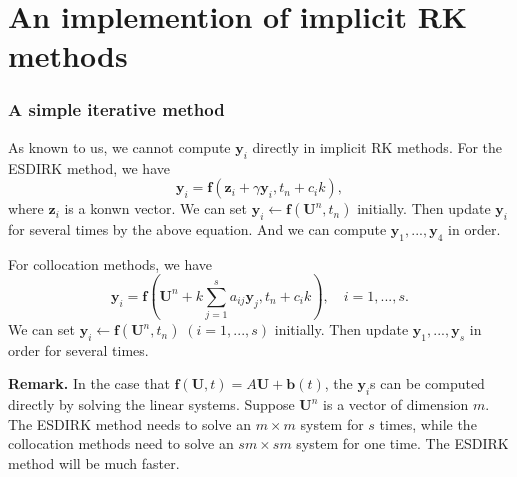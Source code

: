 \documentclass[9pt]{beamer}
\begin{document}
\section{An implemention of implicit RK methods}

\begin{frame}
  \frametitle{A simple iterative method}

  As known to us, we cannot compute $\mathbf{y}_i$ directly in implicit RK methods. For the ESDIRK method, we have
  \begin{equation*}
    \mathbf{y}_i=\mathbf{f}(\mathbf{z}_i+\gamma \mathbf{y}_i,t_n+c_ik),
  \end{equation*}
  where $\mathbf{z}_i$ is a konwn vector. We can set $\mathbf{y}_i\gets\mathbf{f}(\mathbf{U}^n,t_n)$ initially. Then update $\mathbf{y}_i$ for several times by the above equation. And we can compute $\mathbf{y}_1,...,\mathbf{y}_4$ in order.

  For collocation methods, we have
  \begin{equation*}
    \mathbf{y}_i=\mathbf{f}\left(\mathbf{U}^n+k\sum_{j=1}^s a_{ij} \mathbf{y}_j,t_n+c_ik\right),\quad i=1,...,s.
  \end{equation*}
  We can set $\mathbf{y}_i\gets\mathbf{f}(\mathbf{U}^n,t_n)\;(i=1,...,s)$ initially. Then update $\mathbf{y}_1,...,\mathbf{y}_s$ in order for several times.

  \textbf{Remark.} In the case that $\mathbf{f}(\mathbf{U},t)=A\mathbf{U}+\mathbf{b}(t)$, the $\mathbf{y}_i$s can be computed directly by solving the linear systems. Suppose $\mathbf{U}^n$ is a vector of dimension $m$. The ESDIRK method needs to solve an $m\times m$ system for $s$ times, while the collocation methods need to solve an $sm\times sm$ system for one time. The ESDIRK method will be much faster.
\end{frame}
\end{document}

